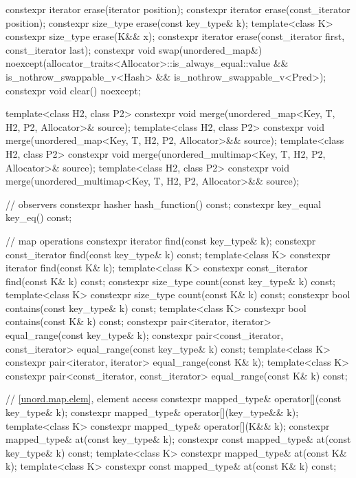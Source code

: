 \begin{codeblock}
{{    constexpr iterator  erase(iterator position);
    constexpr iterator  erase(const_iterator position);
    constexpr size_type erase(const key_type& k);
    template<class K> constexpr size_type erase(K&& x);
    constexpr iterator  erase(const_iterator first, const_iterator last);
    constexpr void      swap(unordered_map&)
      noexcept(allocator_traits<Allocator>::is_always_equal::value &&
               is_nothrow_swappable_v<Hash> && is_nothrow_swappable_v<Pred>);
    constexpr void      clear() noexcept;

    template<class H2, class P2>
      constexpr void merge(unordered_map<Key, T, H2, P2, Allocator>& source);
    template<class H2, class P2>
      constexpr void merge(unordered_map<Key, T, H2, P2, Allocator>&& source);
    template<class H2, class P2>
      constexpr void merge(unordered_multimap<Key, T, H2, P2, Allocator>& source);
    template<class H2, class P2>
      constexpr void merge(unordered_multimap<Key, T, H2, P2, Allocator>&& source);

    // observers
    constexpr hasher hash_function() const;
    constexpr key_equal key_eq() const;

    // map operations
    constexpr iterator         find(const key_type& k);
    constexpr const_iterator   find(const key_type& k) const;
    template<class K>
      constexpr iterator       find(const K& k);
    template<class K>
      constexpr const_iterator find(const K& k) const;
    constexpr size_type        count(const key_type& k) const;
    template<class K>
      constexpr size_type      count(const K& k) const;
    constexpr bool             contains(const key_type& k) const;
    template<class K>
      constexpr bool           contains(const K& k) const;
    constexpr pair<iterator, iterator>               equal_range(const key_type& k);
    constexpr pair<const_iterator, const_iterator>   equal_range(const key_type& k) const;
    template<class K>
      constexpr pair<iterator, iterator>             equal_range(const K& k);
    template<class K>
      constexpr pair<const_iterator, const_iterator> equal_range(const K& k) const;

    // \ref{unord.map.elem}, element access
    constexpr mapped_type& operator[](const key_type& k);
    constexpr mapped_type& operator[](key_type&& k);
    template<class K> constexpr mapped_type& operator[](K&& k);
    constexpr mapped_type& at(const key_type& k);
    constexpr const mapped_type& at(const key_type& k) const;
    template<class K> constexpr mapped_type& at(const K& k);
    template<class K> constexpr const mapped_type& at(const K& k) const;

}}
\end{codeblock}
